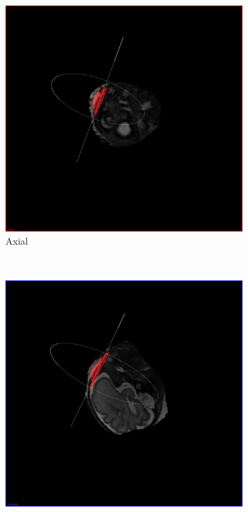 \begin{figure}[H]
  \centering
  \begin{subfigure}[b]{0.4\textwidth}
    \includegraphics[width=\textwidth]{images/next_scan_plane/axial.png}
    \caption*{Axial}
    \label{fig:nextscanplaneaxial}
  \end{subfigure}%
  ~ %
  \begin{subfigure}[b]{0.4\textwidth}
    \includegraphics[width=\textwidth]{images/next_scan_plane/coronal.png}

\end{subfigure}
\end{figure}
